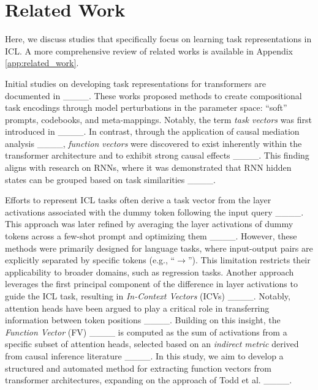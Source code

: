 \section{Related Work}
\label{sec:related_work_task_repr}
Here, we discuss studies that specifically focus on learning task representations in ICL. A more comprehensive review of related works is available in Appendix \ref{app:related_work}.

Initial studies on developing task representations for transformers are documented in ____. These works proposed methods to create compositional task encodings through model perturbations in the parameter space: ``soft'' prompts, codebooks, and meta-mappings. Notably, the term \emph{task vectors} was first introduced in ____. In contrast, through the application of causal mediation analysis ____, \textit{function vectors} were discovered to exist inherently within the transformer architecture and to exhibit strong causal effects ____. This finding aligns with research on RNNs, where it was demonstrated that RNN hidden states can be grouped based on task similarities ____.

Efforts to represent ICL tasks often derive a task vector from the layer activations associated with the dummy token following the input query ____. This approach was later refined by averaging the layer activations of dummy tokens across a few-shot prompt and optimizing them ____. However, these methods were primarily designed for language tasks, where input-output pairs are explicitly separated by specific tokens (e.g., ``\(\rightarrow\)''). This limitation restricts their applicability to broader domains, such as regression tasks. Another approach leverages the first principal component of the difference in layer activations to guide the ICL task, resulting in \textit{In-Context Vectors} (ICVs) ____. Notably, attention heads have been argued to play a critical role in transferring information between token positions ____. Building on this insight, the \textit{Function Vector} (FV) ____ is computed as the sum of activations from a specific subset of attention heads, selected based on an \emph{indirect metric} derived from causal inference literature ____. In this study, we aim to develop a structured and automated method for extracting function vectors from transformer architectures, expanding on the approach of Todd et al. ____.